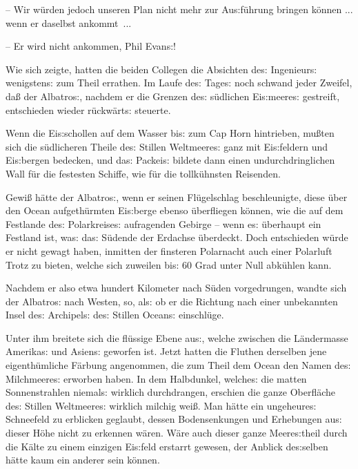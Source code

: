 \documentclass[oneside,12pt]{book}
\newcommand{\s}{s:}
\begin{document}
-- Wir w\"urden jedoch unseren Plan nicht mehr zur Au{\s}f\"uhrung
bringen k\"onnen ... wenn er daselbst ankommt~...

-- Er wird nicht ankommen, Phil Evan{\s}!{\grqq}

Wie sich zeigte, hatten die beiden Collegen die Absichten de{\s}
Ingenieur{\s} wenigsten{\s} zum Theil errathen. Im Laufe de{\s}
Tage{\s} noch schwand jeder Zweifel, da{\ss} der
{\glqq}Albatro{\s}{\grqq}, nachdem er die Grenzen de{\s} s\"udlichen
Ei{\s}meere{\s} gestreift, entschieden wieder r\"uckw\"art{\s}
steuerte.

Wenn die Ei{\s}schollen auf dem Wasser bi{\s} zum Cap Horn
hintrieben, mu{\ss}ten sich die s\"udlicheren Theile de{\s} Stillen
Weltmeere{\s} ganz mit Ei{\s}feldern und Ei{\s}bergen bedecken, und
da{\s} Packei{\s} bildete dann einen undurchdringlichen Wall f\"ur
die festesten Schiffe, wie f\"ur die tollk\"uhnsten Reisenden.

Gewi{\ss} h\"atte der {\glqq}Albatro{\s}{\grqq}, wenn er seinen
Fl\"ugelschlag beschleunigte, diese \"uber den Ocean aufgeth\"urmten
Ei{\s}berge ebenso \"uberfliegen k\"onnen, wie die auf dem Festlande
de{\s} Polarkreise{\s} aufragenden Gebirge -- wenn e{\s} \"uberhaupt
ein Festland ist, wa{\s} da{\s} S\"udende der Erdachse \"uberdeckt.
Doch entschieden w\"urde er nicht gewagt haben, inmitten der
finsteren Polarnacht auch einer Polarluft Trotz zu bieten, welche
sich zuweilen bi{\s} 60 Grad unter Null abk\"uhlen kann.

Nachdem er also etwa hundert Kilometer nach S\"uden vorgedrungen,
wandte sich der {\glqq}Albatro{\s}{\grqq} nach Westen, so, al{\s} ob
er die Richtung nach einer unbekannten Insel de{\s} Archipel{\s}
de{\s} Stillen Ocean{\s} einschl\"uge.

Unter ihm breitete sich die fl\"ussige Ebene au{\s}, welche zwischen
die L\"andermasse Amerika{\s} und Asien{\s} geworfen ist. Jetzt
hatten die Fluthen derselben jene eigenth\"umliche F\"arbung
angenommen, die zum Theil dem Ocean den Namen de{\s}
{\glqq}Milchmeere{\s}{\grqq} erworben haben. In dem Halbdunkel,
welche{\s} die matten Sonnenstrahlen niemal{\s} wirklich
durchdrangen, erschien die ganze Oberfl\"ache de{\s} Stillen
Weltmeere{\s} wirklich milchig wei{\ss}. Man h\"atte ein
ungeheure{\s} Schneefeld zu erblicken geglaubt, dessen Bodensenkungen
und Erhebungen au{\s} dieser H\"ohe nicht zu erkennen w\"aren. W\"are
auch dieser ganze Meere{\s}theil durch die K\"alte zu einem einzigen
Ei{\s}feld erstarrt gewesen, der Anblick de{\s}selben h\"atte kaum
ein anderer sein k\"onnen.
\end{document}
